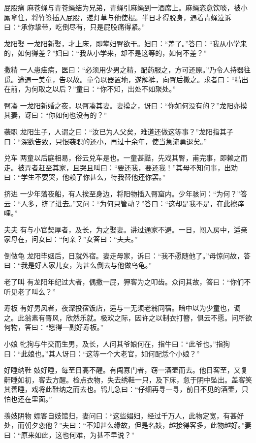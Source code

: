 \documentclass[12pt,UTF8]{ctexbook}
\begin{document}
屁股痛
麻苍蝇与青苍蝇结为兄弟，青蝇引麻蝇到一酒席上。麻蝇恣意饮啖，被小厮拿住，将竹签插入屁股，递灯草与他使棍。半日才得脱身，遇着青蝇泣诉曰：“承你挚带，吃倒尽有，只是屁股痛得紧。”

龙阳娶
一龙阳新娶，才上床，即攀妇臀欲干。妇曰：“差了。”答曰：“我从小学来的，如何得差？”妇曰：“我从小学来，却不是这等的，如何不差？”

撒精
一人患㾀病，医曰：“必须用少男之精，配药服之，方可还原。”乃令人持器往觅。途遇一美童，告以故。童令以器置地，遂解裤，向臀后撒之。求者曰：“精出在前，为何取之以后？”童曰：“你不知，出处不如聚处。”

臀凑
一龙阳新婚之夜，以臀凑其妻。妻摸之，讶曰：“你如何没有的？”龙阳亦摸其妻，讶曰：“你如何也没有的？”

袭职
龙阳生子，人谓之曰：“汝已为人父矣，难道还做这等事？”龙阳指其子曰：“深欲告致，只恨袭职的还小，再过十余年，使当急流勇退矣。”

兑车
两童以后庭相易，俗云兑车是也。一童甚黠，先戏其臀，甫完事，即赖之而走。被弄者赶至其家，且哭且叫曰：“要还我，要还我！”其母不知何事，出劝曰：“学生不要哭，他赖了你甚么，待我替他还你罢。”

挤进
一少年落夜船，有人挨至身边，将阳物插入臀窟内。少年骇问：“为何？”答云：“人多，挤了进去。”又问：“为何只管动？”答曰：“这却是我不是，在此擦痒哩。”

夫夫
有与小官契厚者，及长，为之娶妻。讲过通家不避。一日，闯入房中，适亲家母在，问女曰：“何亲？”女答曰：“夫夫。”

倒做龟
龙阳毕姻后，日就外宿。妻走母家，诉曰：“我不愿随他了。”母惊问故，答曰：“我是好人家儿女，为甚么倒去与他做乌龟。”

老了叫
有龙阳年纪过大者，偶撒一屁，狎客为之叩齿。众问其故，答曰：“你们不听见老了叫么？”

寿板
有好男风者，夜深投宿饭店，适与一无须老翁同宿。暗中以为少童也，调之。此翁素有臀风，欣然乐就。极欢之际，因许之以制衣打簪，俱云不愿。问所欲何物，答曰：“愿得一副好寿板。”

小娘
牝狗与牛交而生男，及长，人问其爷娘何在，指牛曰：“此爷也。”指狗曰：“此娘也。”其人讶曰：“这等一个大老官，如何配恁个小娘？”

好睡纳鞋
妓好睡，每至日高不醒。有闯寡门者，窃一酒壶而去。他日客至，又复鼾睡如初，客去方醒。检点衣物，失去绣鞋一只，及下床，忽于阴中坠出。盖客笑其善睡，戏将此鞋纳之而去也。鸨儿急曰：“仔细再寻一寻，前日不见的酒壶，只怕也还在里面。”

羡妓阴物
嫖客自妓馆归，妻问曰：“这些娼妇，经过千万人，此物定宽，有甚好处，而朝夕恋他？”夫曰：“不知甚么缘故，但是名妓，越接得客多，此物越好。”妻曰：“原来如此，这也何难，为甚不早说？”
\end{document}
